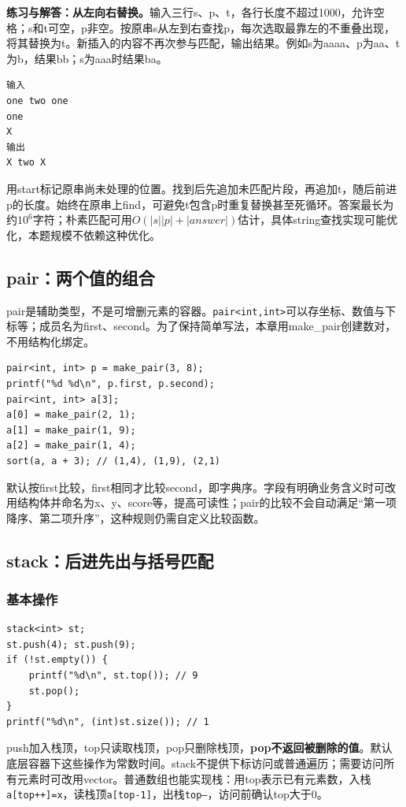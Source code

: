 \textbf{练习与解答：从左向右替换。}输入三行s、p、t，各行长度不超过1000，允许空格；s和t可空，p非空。按原串s从左到右查找p，每次选取最靠左的不重叠出现，将其替换为t。新插入的内容不再次参与匹配，输出结果。例如s为aaaa、p为aa、t为b，结果bb；s为aaa时结果ba。
\begin{verbatim}
输入
one two one
one
X
输出
X two X
\end{verbatim}
用start标记原串尚未处理的位置。找到后先追加未匹配片段，再追加t，随后前进p的长度。始终在原串上find，可避免t包含p时重复替换甚至死循环。答案最长为约$10^6$字符；朴素匹配可用$O(|s||p|+|answer|)$估计，具体string查找实现可能优化，本题规模不依赖这种优化。

\subsection{pair：两个值的组合}
pair是辅助类型，不是可增删元素的容器。\texttt{pair<int,int>}可以存坐标、数值与下标等；成员名为first、second。为了保持简单写法，本章用make\_pair创建数对，不用结构化绑定。
\begin{lstlisting}
pair<int, int> p = make_pair(3, 8);
printf("%d %d\n", p.first, p.second);
pair<int, int> a[3];
a[0] = make_pair(2, 1);
a[1] = make_pair(1, 9);
a[2] = make_pair(1, 4);
sort(a, a + 3); // (1,4), (1,9), (2,1)
\end{lstlisting}
默认按first比较，first相同才比较second，即字典序。字段有明确业务含义时可改用结构体并命名为x、y、score等，提高可读性；pair的比较不会自动满足“第一项降序、第二项升序”，这种规则仍需自定义比较函数。

\subsection{stack：后进先出与括号匹配}
\subsubsection{基本操作}
\begin{lstlisting}
stack<int> st;
st.push(4); st.push(9);
if (!st.empty()) {
    printf("%d\n", st.top()); // 9
    st.pop();
}
printf("%d\n", (int)st.size()); // 1
\end{lstlisting}
push加入栈顶，top只读取栈顶，pop只删除栈顶，\textbf{pop不返回被删除的值}。默认底层容器下这些操作为常数时间。stack不提供下标访问或普通遍历；需要访问所有元素时可改用vector。普通数组也能实现栈：用top表示已有元素数，入栈\texttt{a[top++]=x}，读栈顶\texttt{a[top-1]}，出栈\texttt{top--}，访问前确认top大于0。


